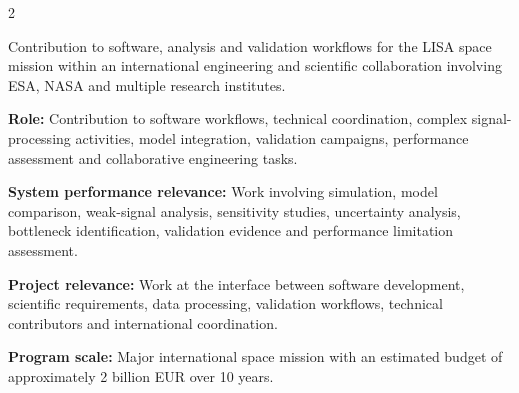 \documentclass[8pt,a4paper,ragged2e,withhyper]{altacv}
\begin{document}
\begin{paracol}{2}

\divider

\divider

\medskip


\divider

\divider

\divider


\end{paracol}



Contribution to software, analysis and validation workflows for the LISA space mission within an international engineering and scientific collaboration involving ESA, NASA and multiple research institutes.

\textbf{Role:} Contribution to software workflows, technical coordination, complex signal-processing activities, model integration, validation campaigns, performance assessment and collaborative engineering tasks.

\textbf{System performance relevance:} Work involving simulation, model comparison, weak-signal analysis, sensitivity studies, uncertainty analysis, bottleneck identification, validation evidence and performance limitation assessment.

\textbf{Project relevance:} Work at the interface between software development, scientific requirements, data processing, validation workflows, technical contributors and international coordination.

\textbf{Program scale:} Major international space mission with an estimated budget of approximately 2 billion EUR over 10 years.

\divider

\end{document}
